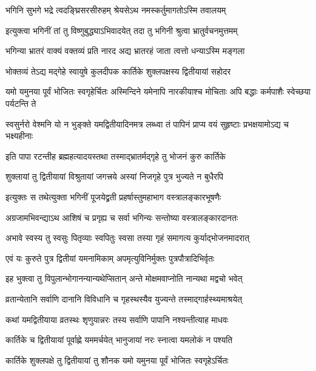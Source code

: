 \twolineshloka
{भगिनि सुभगे भद्रे त्वदङ्घ्रिसरसीरुहम्}
{श्रेयसेऽथ नमस्कर्तुमागतोऽस्मि तवालयम्} %

\twolineshloka
{इत्युक्त्वा भगिनीं तां तु विष्णुबुद्ध्याऽभिवादयेत्}
{तदा तु भगिनी श्रुत्वा भ्रातुर्वचनमुत्तमम्} %

\twolineshloka
{भगिन्या भ्रातरं वाक्यं वक्तव्यं प्रति नारद}
{अद्य भ्रातरहं जाता त्वत्तो धन्याऽस्मि मङ्गला} %

\twolineshloka
{भोक्तव्यं तेऽद्य मद्गेहे स्वायुषे कुलदीपक}
{कार्तिके शुक्लपक्षस्य द्वितीयायां सहोदर} %

\threelineshloka
{यमो यमुनया पूर्वं भोजितः स्वगृहेर्चितः}
{अस्मिन्दिने यमेनापि नारकीयाश्च मोचिताः}
{अपि बद्धाः कर्मपाशैः स्वेच्छया पर्यटन्ति ते} %

\fourlineindentedshloka
{स्वसुर्नरो वेश्मनि यो न भुङ्क्ते}
{यमद्वितीयादिनमत्र लब्ध्वा}
{तं पापिनं प्राप्य वयं सुहृष्टाः}
{प्रभक्षयामोऽद्य च भक्ष्यहीनाः} %

\twolineshloka
{इति पापा रटन्तीह ब्रह्महत्यादयस्तथा}
{तस्माद्भ्रातर्मद्गृहे तु भोजनं कुरु कार्तिके} %


\twolineshloka
{शुक्लायां तु द्वितीयायां विश्रुतायां जगत्त्रये}
{अस्यां निजगृहे पुत्र भुज्यते न बुधैरपि} %

\twolineshloka
{इत्युक्तः स तथेत्युक्ता भगिनीं पूजयेद्व्रती}
{प्रहर्षास्तुमहाभाग वस्त्रालङ्कारभूषणैः} %

\twolineshloka
{अग्रजामभिवन्द्याऽथ आशिषं च प्रगृह्य च}
{सर्वा भगिन्यः सन्तोष्या वस्त्रालङ्कारदानतः} %

\twolineshloka
{अभावे स्वस्य तु स्वसुः पितृव्याः स्वपितुः स्वसा}
{तस्या गृहं समागत्य कुर्याद्भोजनमादरात्} %

\twolineshloka
{एवं यः कुरुते पुत्र द्वितीयां यमनामिकाम्}
{अपमृत्युविनिर्मुक्तः पुत्रपौत्रादिभिर्वृतः} %

\twolineshloka
{इह भुक्त्वा तु विपुलान्भोगानन्यान्यथेप्सितान्}
{अन्ते मोक्षमवाप्नोति नान्यथा मद्वचो भवेत्} %

\twolineshloka
{व्रतान्येतानि सर्वाणि दानानि विविधानि च}
{गृहस्थस्यैव युज्यन्ते तस्माद्गार्हस्थ्यमाश्रयेत्} %

\twolineshloka
{कथां यमद्वितीयाया व्रतस्थः शृणुयान्नरः}
{तस्य सर्वाणि पापानि नश्यन्तीत्याह माधवः} %


\twolineshloka
{कार्तिके च द्वितीयायां पूर्वाह्णे यममर्चयेत्}
{भानुजायां नरः स्नात्वा यमलोकं न पश्यति} %

\twolineshloka
{कार्तिके शुक्लपक्षे तु द्वितीयायां तु शौनक}
{यमो यमुनया पूर्वं भोजितः स्वगृहेऽर्चितः} %

